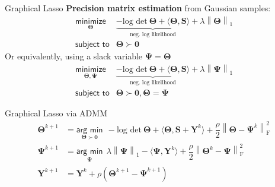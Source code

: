 \documentclass[aspectratio=169]{beamer}
\newcommand{\norm}[1]{\left\lVert#1\right\rVert}
\begin{document}
                \begin{frame}{Graphical Lasso}
                  \textbf{Precision matrix estimation} from Gaussian samples:
                  {\large
                  \begin{equation*}
                     \begin{array}{ll}
                       \underset{\boldsymbol \Theta}{\textsf{minimize}} & \underbrace{- \textrm{log det} ~ \boldsymbol \Theta + \langle \boldsymbol \Theta, \bm S\rangle}_{\text{neg. log likelihood}} + \lambda \norm{\boldsymbol \Theta}_{1}\\
                       \textsf{subject to} & \boldsymbol \Theta \succ \mathbf{0}
                      \end{array}
                 \end{equation*}
                    }
                  Or equivalently, using a slack variable $\boldsymbol \Psi = \boldsymbol \Theta$ 
                    {\large
                    \begin{equation*}
                       \begin{array}{ll}
                         \underset{\boldsymbol \Theta, \boldsymbol \Psi}{\textsf{minimize}} & \underbrace{- \textrm{log det} ~ \boldsymbol \Theta + \langle \boldsymbol \Theta, \bm S\rangle}_{\text{neg. log likelihood}} + \lambda \norm{\boldsymbol \Psi}_{1}\\
                         \textsf{subject to} & \boldsymbol \Theta \succ \mathbf{0}, \boldsymbol \Theta = \boldsymbol \Psi
                        \end{array}
                   \end{equation*}
                      }
                \end{frame}

                \begin{frame}{Graphical Lasso via ADMM}
                  \begin{align*}
                    \boldsymbol \Theta^{k+1} & = \underset{\boldsymbol \Theta \succ \mathbf{0}}{\textsf{arg min}} ~~ - \textrm{log det} ~ \boldsymbol \Theta + \langle \boldsymbol \Theta, \bm S + \bm Y^k\rangle + \dfrac{\rho}{2}\norm{\boldsymbol \Theta - \boldsymbol \Psi^k}^2_{\textrm{F}}\\
                    \boldsymbol \Psi^{k+1} & = \underset{\boldsymbol \Psi}{\textsf{arg min}} ~~ \lambda \norm{\boldsymbol \Psi}_{1} - \langle \boldsymbol \Psi, \bm Y^k\rangle + \dfrac{\rho}{2}\norm{\boldsymbol \Theta^k - \boldsymbol \Psi}^2_{\textrm{F}}\\
                    \bm Y^{k+1} & = \bm Y^k + \rho\left(\boldsymbol \Theta^{k+1} - \boldsymbol \Psi^{k+1}\right)
                  \end{align*}
                \end{frame}
\end{document}
